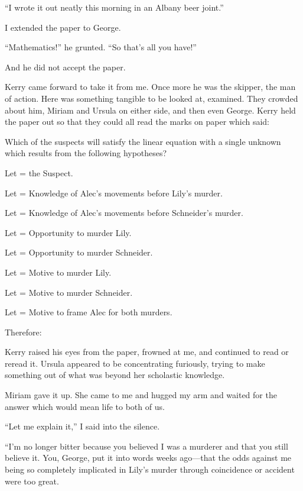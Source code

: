 \documentclass{novel}
\begin{document}
“I wrote it out neatly this morning in an Albany beer joint.”

I extended the paper to George.

“Mathematics!” he grunted. “So that’s all you have!”

And he did not accept the paper.

Kerry came forward to take it from me. Once more he was the skipper, the man of action. Here was something tangible to be looked at, examined. They crowded about him, Miriam and Ursula on either side, and then even George. Kerry held the paper out so that they could all read the marks on paper which said:

Which of the suspects will satisfy the linear equation with a single unknown which results from the following hypotheses?

\null

\noindent Let  = the Suspect.

\noindent Let  = Knowledge of Alec’s movements before Lily’s murder.

\noindent Let  = Knowledge of Alec’s movements before Schneider’s murder.

\noindent Let  = Opportunity to murder Lily.

\noindent Let  = Opportunity to murder Schneider.

\noindent Let  = Motive to murder Lily.

\noindent Let  = Motive to murder Schneider.

\noindent Let  = Motive to frame Alec for both murders.

\noindent Therefore:

\noindent{}

\scenestars

Kerry raised his eyes from the paper, frowned at me, and continued to read or reread it. Ursula appeared to be concentrating furiously, trying to make something out of what was beyond her scholastic knowledge.

Miriam gave it up. She came to me and hugged my arm and waited for the answer which would mean life to both of us.

“Let me explain it,” I said into the silence.

“I’m no longer bitter because you believed I was a murderer and that you still believe it. You, George, put it into words weeks ago—that the odds against me being so completely implicated in Lily’s murder through coincidence or accident were too great. 
\end{document}
